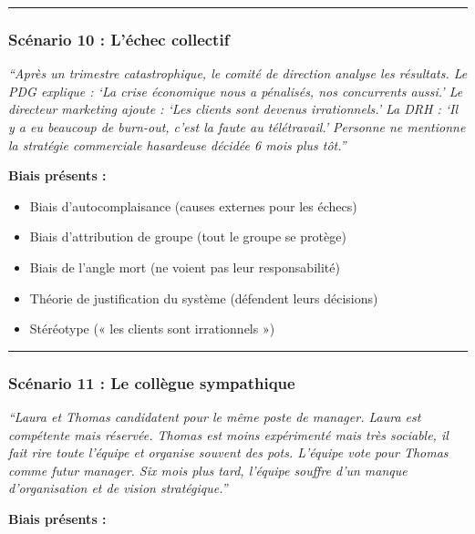 \documentclass[
]{article}
\providecommand{\tightlist}{%
  \setlength{\itemsep}{0pt}\setlength{\parskip}{0pt}}
\begin{document}
\begin{center}\rule{0.5\linewidth}{0.5pt}\end{center}

\subsubsection{Scénario 10 : L'échec
collectif}\label{scuxe9nario-10-luxe9chec-collectif}

\emph{``Après un trimestre catastrophique, le comité de direction
analyse les résultats. Le PDG explique : `La crise économique nous a
pénalisés, nos concurrents aussi.' Le directeur marketing ajoute : `Les
clients sont devenus irrationnels.' La DRH : `Il y a eu beaucoup de
burn-out, c'est la faute au télétravail.' Personne ne mentionne la
stratégie commerciale hasardeuse décidée 6 mois plus tôt.''}

\textbf{Biais présents :}

\begin{itemize}
\tightlist
\item
  Biais d'autocomplaisance (causes externes pour les échecs)
\item
  Biais d'attribution de groupe (tout le groupe se protège)
\item
  Biais de l'angle mort (ne voient pas leur responsabilité)
\item
  Théorie de justification du système (défendent leurs décisions)
\item
  Stéréotype (« les clients sont irrationnels »)
\end{itemize}

\begin{center}\rule{0.5\linewidth}{0.5pt}\end{center}

\subsubsection{Scénario 11 : Le collègue
sympathique}\label{scuxe9nario-11-le-colluxe8gue-sympathique}

\emph{``Laura et Thomas candidatent pour le même poste de manager. Laura
est compétente mais réservée. Thomas est moins expérimenté mais très
sociable, il fait rire toute l'équipe et organise souvent des pots.
L'équipe vote pour Thomas comme futur manager. Six mois plus tard,
l'équipe souffre d'un manque d'organisation et de vision stratégique.''}

\textbf{Biais présents :}
\end{document}
